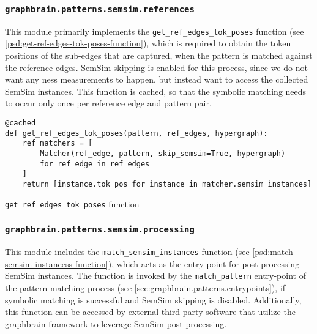 \documentclass[11pt]{scrreprt}
\begin{document}
\subsubsection{\texttt{graphbrain.patterns.semsim.references}}
\label{sec:graphbrain.patterns.semsim.references}
This module primarily implements the \texttt{get\_ref\_edges\_tok\_poses} function (see \cref{psd:get-ref-edges-tok-poses-function}), which is required to obtain the token positions of the sub-edges that are captured, when the pattern is matched against the reference edges. SemSim skipping is enabled for this process, since we do not want any \gls{ness} measurements to happen, but instead  want to access the collected SemSim instances.  This function is cached, so that the symbolic matching needs to occur only once per reference edge and pattern pair.


\begin{pseudo}
\begin{lstlisting}
@cached
def get_ref_edges_tok_poses(pattern, ref_edges, hypergraph):
    ref_matchers = [
        Matcher(ref_edge, pattern, skip_semsim=True, hypergraph)
        for ref_edge in ref_edges
    ]
    return [instance.tok_pos for instance in matcher.semsim_instances]
\end{lstlisting}
\caption{\texttt{get\_ref\_edges\_tok\_poses} function}
\label{psd:get-ref-edges-tok-poses-function}
\end{pseudo}

\subsubsection{\texttt{graphbrain.patterns.semsim.processing}}
\label{sec:graphbrain.patterns.semsim.processing}
This module includes the \texttt{match\_semsim\_instances} function (see \cref{psd:match-semsim-instancess-function}), which acts as the entry-point for post-processing SemSim instances. The function is invoked by the \texttt{match\_pattern} entry-point of the pattern matching process (see  \cref{sec:graphbrain.patterns.entrypoints}), if symbolic matching is successful and SemSim skipping is disabled. Additionally, this function can be accessed by external third-party software that utilize the graphbrain framework to leverage SemSim post-processing.
\end{document}

